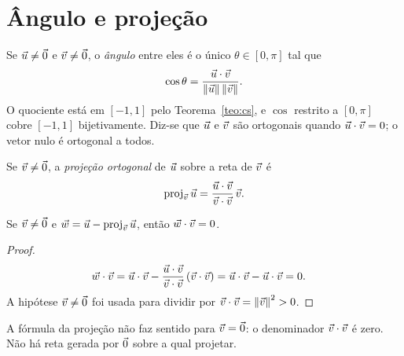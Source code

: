 \documentclass[11pt,a4paper]{article}
\begin{document}
\section{Ângulo e projeção}

\begin{definicao}
Se $\vec{u}\neq\vec{0}$ e $\vec{v}\neq\vec{0}$, o \emph{ângulo} entre eles é o único $\theta\in[0,\pi]$ tal que
\[
\cos\theta=\frac{\vec{u}\cdot\vec{v}}{\left\lVert \vec{u} \right\rVert\left\lVert \vec{v} \right\rVert}.
\]
O quociente está em $[-1,1]$ pelo Teorema~\ref{teo:cs}, e $\cos$ restrito a $[0,\pi]$ cobre $[-1,1]$ bijetivamente. Diz-se que $\vec{u}$ e $\vec{v}$ são ortogonais quando $\vec{u}\cdot\vec{v}=0$; o vetor nulo é ortogonal a todos.
\end{definicao}

\begin{definicao}
Se $\vec{v}\neq\vec{0}$, a \emph{projeção ortogonal} de $\vec{u}$ sobre a reta de $\vec{v}$ é
\[
\operatorname{proj}_{\vec{v}}\vec{u}
=\frac{\vec{u}\cdot\vec{v}}{\vec{v}\cdot\vec{v}}\,\vec{v}.
\]
\end{definicao}

\begin{teorema}\label{teo:proj}
Se $\vec{v}\neq\vec{0}$ e $\vec{w}=\vec{u}-\operatorname{proj}_{\vec{v}}\vec{u}$, então $\vec{w}\cdot\vec{v}=0$.
\end{teorema}

\begin{proof}
\begin{align*}
\vec{w}\cdot\vec{v}
&=\vec{u}\cdot\vec{v}-\frac{\vec{u}\cdot\vec{v}}{\vec{v}\cdot\vec{v}}\,(\vec{v}\cdot\vec{v})
=\vec{u}\cdot\vec{v}-\vec{u}\cdot\vec{v}
=0.
\end{align*}
A hipótese $\vec{v}\neq\vec{0}$ foi usada para dividir por $\vec{v}\cdot\vec{v}=\left\lVert \vec{v} \right\rVert^2>0$.
\end{proof}

\begin{contraexemplo}
A fórmula da projeção não faz sentido para $\vec{v}=\vec{0}$: o denominador $\vec{v}\cdot\vec{v}$ é zero. Não há reta gerada por $\vec{0}$ sobre a qual projetar.
\end{contraexemplo}

\end{document}
